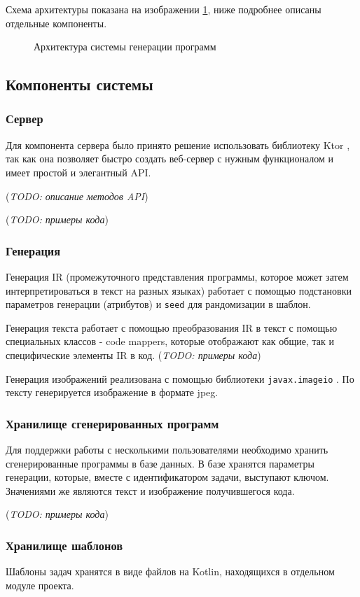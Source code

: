 Схема архитектуры показана на изображении \ref{architecture}, ниже подробнее описаны отдельные
компоненты.

\begin{figure}[ht]
    \begin{center}
        \scalebox{0.5}{
            
        }
        \caption{\label{architecture} Архитектура системы генерации программ}
    \end{center}
\end{figure}
\clearpage



\subsection{Компоненты системы}
\subsubsection{Сервер}
Для компонента сервера было принято решение использовать библиотеку Ktor \cite{ktor}, так как
она позволяет быстро создать веб-сервер с нужным функционалом и имеет простой и элегантный API.

(\textit{TODO: описание методов API})

(\textit{TODO: примеры кода})

\subsubsection{Генерация}
Генерация IR (промежуточного представления программы, которое может затем
интерпретироваться в текст на разных языках) работает с помощью подстановки
параметров генерации (атрибутов) и \texttt{seed} для рандомизации в шаблон.

Генерация текста работает с помощью преобразования IR в текст с помощью
специальных классов - code mappers, которые отображают как общие, так и
специфические элементы IR в код. (\textit{TODO: примеры кода})

Генерация изображений реализована с помощью библиотеки \texttt{javax.imageio}
\cite{imageio}. По тексту генерируется изображение в формате jpeg.

\subsubsection{Хранилище сгенерированных программ}
Для поддержки работы с несколькими пользователями необходимо хранить сгенерированные
программы в базе данных. В базе хранятся параметры генерации, которые, вместе с
идентификатором задачи, выступают ключом. Значениями же являются текст и изображение
получившегося кода.

(\textit{TODO: примеры кода})

\subsubsection{Хранилище шаблонов}
Шаблоны задач хранятся в виде файлов на Kotlin, находящихся в отдельном модуле
проекта.
